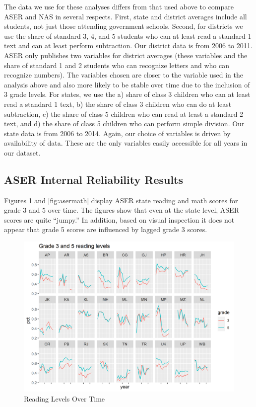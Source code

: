 \documentclass[
  11pt,
]{article}
\begin{document}
The data we use for these analyses differs from that used above to compare ASER and NAS in several respects. First, state and district averages include all students, not just those attending government schools. Second, for districts we use the share of standard 3, 4, and 5 students who can at least read a standard 1 text and can at least perform subtraction. Our district data is from 2006 to 2011. ASER only publishes two variables for district averages (these variables and the share of standard 1 and 2 students who can recognize letters and who can recognize numbers). The variables chosen are closer to the variable used in the analysis above and also more likely to be stable over time due to the inclusion of 3 grade levels. For states, we use the a) share of class 3 children who can at least read a standard 1 text, b) the share of class 3 children who can do at least subtraction, c) the share of class 5 children who can read at least a standard 2 text, and d) the share of class 5 children who can perform simple division. Our state data is from 2006 to 2014. Again, our choice of variables is driven by availability of data. These are the only variables easily accessible for all years in our dataset.

\hypertarget{aser-internal-reliability-results}{%
\subsection{ASER Internal Reliability Results}\label{aser-internal-reliability-results}}

Figures \ref{fig:aserread} and \ref{fig:asermath} display ASER state reading and math scores for grade 3 and 5 over time. The figures show that even at the state level, ASER scores are quite ``jumpy.'' In addition, based on visual inspection it does not appear that grade 5 scores are influenced by lagged grade 3 scores.

\begin{figure}

{\centering \includegraphics[width=0.8\linewidth]{aser reading over time} 

}

\caption{Reading Levels Over Time}\label{fig:aserread}
\end{figure}
\end{document}
